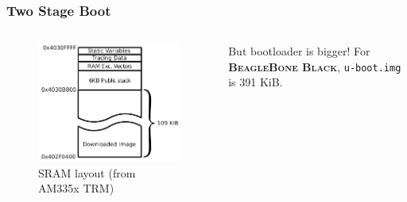 \begin{frame}
  \frametitle{Two Stage Boot}
  \begin{columns}
      \begin{figure}
        \centering
        \includegraphics[scale=1]{images/sram.pdf}
        \caption{SRAM layout (from AM335x TRM)}
      \end{figure}
    \pause
      \begin{alertblock}{But bootloader is bigger!}
      For \textbf{\textsc{BeagleBone Black}}, \texttt{u-boot.img} is 391 KiB.
      \end{alertblock}
  \end{columns}
\end{frame}

